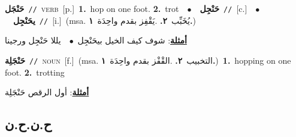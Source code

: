 \documentclass[10pt,a4paper,twoside]{article} %
\begin{document}
\begin{multicols}{2}
{\setlength\topsep{0pt}\textbf{\foreignlanguage{arabic}{حَنْجَل}}\ {\color{gray}\texttt{//}\color{black}}\ \textsc{verb}\ [p.]\ \textbf{1.}~hop on one foot.  \textbf{2.}~trot\ \ $\bullet$\ \ \setlength\topsep{0pt}\textbf{\foreignlanguage{arabic}{حَنْجِل}}\ {\color{gray}\texttt{//}\color{black}}\ [c.]\ \ $\bullet$\ \ \setlength\topsep{0pt}\textbf{\foreignlanguage{arabic}{يحَنْجِل}}\ {\color{gray}\texttt{//}\color{black}}\ [i.]\ \color{gray}(msa. \foreignlanguage{arabic}{يُخَبِّب}~\foreignlanguage{arabic}{\textbf{٢.}}  .\foreignlanguage{arabic}{يَقْفِز بقدم واحِدَة}~\foreignlanguage{arabic}{\textbf{١.}})\color{black}\  \begin{flushright}\color{gray}\foreignlanguage{arabic}{\textbf{\underline{\foreignlanguage{arabic}{أمثلة}}}: شوف كيف الخيل بيحَنْجِل\ $\bullet$\ \  يللا حَنْجِل ورجينا}\end{flushright}\color{black}} \vspace{2mm}

{\setlength\topsep{0pt}\textbf{\foreignlanguage{arabic}{حَنْجَلِة}}\ {\color{gray}\texttt{//}\color{black}}\ \textsc{noun}\ [f.]\ \color{gray}(msa. \foreignlanguage{arabic}{التخبيب}~\foreignlanguage{arabic}{\textbf{٢.}}  .\foreignlanguage{arabic}{القْفْز بقدم واحِدَة}~\foreignlanguage{arabic}{\textbf{١.}})\color{black}\ \textbf{1.}~hopping on one foot.  \textbf{2.}~trotting\  \begin{flushright}\color{gray}\foreignlanguage{arabic}{\textbf{\underline{\foreignlanguage{arabic}{أمثلة}}}: أول الرقص حَنْجَلِة}\end{flushright}\color{black}} \vspace{2mm}

\vspace{-3mm}
\subsection*{\color{blue}\foreignlanguage{arabic}{ح.ن.ح.ن}\color{blue}{}} 


\end{multicols}
\end{document}
